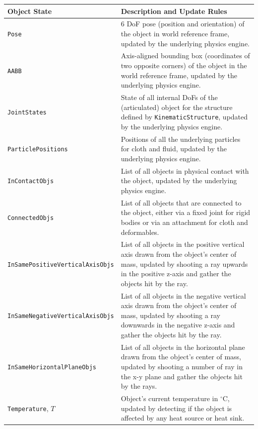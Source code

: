 \begin{table}[!htbp]
\begin{center}
{\scriptsize%
\renewcommand{\arraystretch}{1.2}
\begin{tabular}{ | m{4cm} | m{9cm} | } 
\hline
\textbf{Object State} & \textbf{Description and Update Rules} \\ 
\hline
\texttt{Pose} & 6 DoF pose (position and orientation) of the object in world reference frame, updated by the underlying physics engine.\\ 
\hline
\texttt{AABB} & Axis-aligned bounding box (coordinates of two opposite corners) of the object in the world reference frame, updated by the underlying physics engine.\\ 
\hline
\texttt{JointStates} & State of all internal DoFs of the (articulated) object for the structure defined by \texttt{KinematicStructure}, updated by the underlying physics engine.\\ 
\hline
\texttt{ParticlePositions} & Positions of all the underlying particles for cloth and fluid, updated by the underlying physics engine.\\ 
\hline
\texttt{InContactObjs} & List of all objects in physical contact with the object, updated by the underlying physics engine.\\ 
\hline
\texttt{ConnectedObjs} & List of all objects that are connected to the object, either via a fixed joint for rigid bodies or via an attachment for cloth and deformables.\\ 
\hline
\texttt{InSamePositiveVerticalAxisObjs} & List of all objects in the positive vertical axis drawn from the object's center of mass, updated by shooting a ray upwards in the positive z-axis and gather the objects hit by the ray.\\ 
\hline
\texttt{InSameNegativeVerticalAxisObjs} & List of all objects in the negative vertical axis drawn from the object's center of mass, updated by shooting a ray downwards in the negative z-axis and gather the objects hit by the ray.\\ 
\hline
\texttt{InSameHorizontalPlaneObjs} & List of all objects in the horizontal plane drawn from the object's center of mass, updated by shooting a number of ray in the x-y plane and gather the objects hit by the rays.\\ 
\hline
\texttt{Temperature}, $T$ & Object's current temperature in $^\circ$C, updated by detecting if the object is affected by any heat source or heat sink.\\ 

\end{tabular}}
\end{center}
\end{table}
